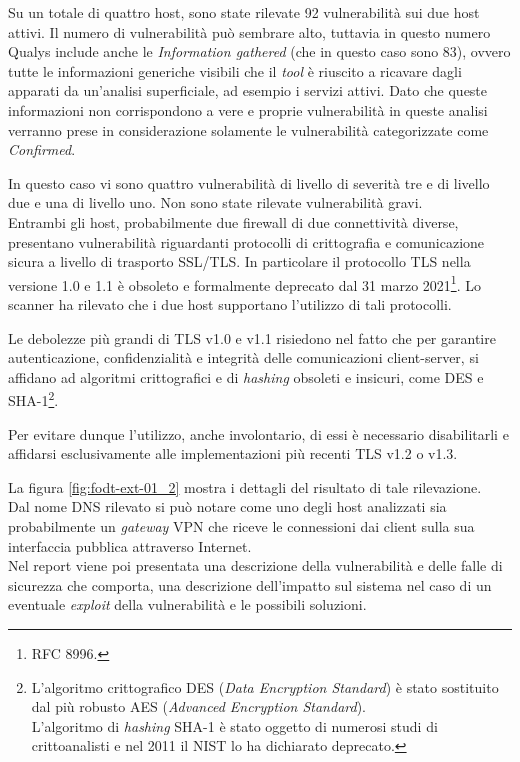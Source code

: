 \documentclass[target=bach,aauheader=]{thud}
\begin{document}
Su un totale di quattro host, sono state rilevate 92 vulnerabilità sui due host attivi. Il numero di vulnerabilità può sembrare alto, tuttavia in questo numero Qualys include anche le \textit{Information gathered} (che in questo caso sono 83), ovvero tutte le informazioni generiche visibili che il \textit{tool} è riuscito a ricavare dagli apparati da un'analisi superficiale, ad esempio i servizi attivi. Dato che queste informazioni non corrispondono a vere e proprie vulnerabilità in queste analisi verranno prese in considerazione solamente le vulnerabilità categorizzate come \textit{Confirmed}.

In questo caso vi sono quattro vulnerabilità di livello di severità tre e di livello due e una di livello uno. Non sono state rilevate vulnerabilità gravi.
\\ Entrambi gli host, probabilmente due firewall di due connettività diverse, presentano vulnerabilità riguardanti protocolli di crittografia e comunicazione sicura a livello di trasporto SSL/TLS. In particolare il protocollo TLS nella versione 1.0 e 1.1 è obsoleto e formalmente deprecato dal 31 marzo 2021\footnote{RFC 8996.}. Lo scanner ha rilevato che i due host supportano l'utilizzo di tali protocolli.

Le debolezze più grandi di TLS v1.0 e v1.1 risiedono nel fatto che per garantire autenticazione, confidenzialità e integrità delle comunicazioni client-server, si affidano ad algoritmi crittografici e di \textit{hashing} obsoleti e insicuri, come DES e SHA-1\footnote{L'algoritmo crittografico DES (\textit{Data Encryption Standard}) è stato sostituito dal più robusto AES (\textit{Advanced Encryption Standard}).
\\ L'algoritmo di \textit{hashing} SHA-1 è stato oggetto di numerosi studi di crittoanalisti e nel 2011 il NIST lo ha dichiarato deprecato.}.

Per evitare dunque l'utilizzo, anche involontario, di essi è necessario disabilitarli e affidarsi esclusivamente alle implementazioni più recenti TLS v1.2 o v1.3.

La figura \ref{fig:fodt-ext-01_2} mostra i dettagli del risultato di tale rilevazione.
\\ Dal nome DNS rilevato si può notare come uno degli host analizzati sia probabilmente un \textit{gateway} VPN che riceve le connessioni dai client sulla sua interfaccia pubblica attraverso Internet. 
\\ Nel report viene poi presentata una descrizione della vulnerabilità e delle falle di sicurezza che comporta, una descrizione dell'impatto sul sistema nel caso di un eventuale \textit{exploit} della vulnerabilità e le possibili soluzioni.
\end{document}

